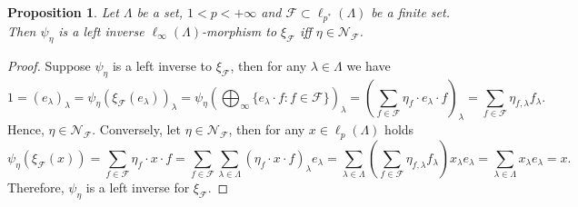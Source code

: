 \documentclass[12pt]{article}
\newtheorem{proposition}[theorem]{Proposition}
\begin{document}
\begin{proposition}\label{StdEmbdLeftInvCharac}
    Let $\Lambda$ be a set, $1<p<+\infty$ 
    and $\mathcal{F}\subset\ell_{p^*}(\Lambda)$ be a finite set. 
    Then $\psi_\eta$ is a left inverse $\ell_\infty(\Lambda)$-morphism 
    to $\xi_{\mathcal{F}}$ iff $\eta\in\mathcal{N}_{\mathcal{F}}$.
\end{proposition}
\begin{proof} 
    Suppose $\psi_{\eta}$ is a left inverse to $\xi_{\mathcal{F}}$, then
    for any $\lambda\in\Lambda$ we have
    \[
        1=(e_\lambda)_\lambda
        =\psi_{\eta}(\xi_{\mathcal{F}}(e_\lambda))_\lambda
        =\psi_{\eta}\left(\bigoplus_\infty\{
            e_\lambda\cdot f: f\in\mathcal{F}
        \}\right)_\lambda
        =\left(
            \sum_{f\in\mathcal{F}} \eta_f\cdot e_\lambda\cdot f
        \right)_\lambda
        =\sum_{f\in\mathcal{F}} \eta_{f,\lambda}f_\lambda.
    \]
    Hence, $\eta\in\mathcal{N}_{\mathcal{F}}$.
    Conversely, let $\eta\in\mathcal{N}_{\mathcal{F}}$, then for 
    any $x\in\ell_p(\Lambda)$ holds
    \[
        \psi_\eta(\xi_{\mathcal{F}}(x))
        =\sum_{f\in\mathcal{F}}\eta_f\cdot x\cdot f 
        =\sum_{f\in\mathcal{F}}\sum_{\lambda\in\Lambda} 
            (\eta_f\cdot x\cdot f)_\lambda e_\lambda 
        =\sum_{\lambda\in\Lambda} 
            \left(\sum_{f\in\mathcal{F}}\eta_{f,\lambda}f_\lambda\right) 
            x_\lambda e_\lambda 
        =\sum_{\lambda\in\Lambda} x_\lambda e_\lambda 
        =x. 
    \]
    Therefore, $\psi_\eta$ is a left inverse for $\xi_{\mathcal{F}}$.
\end{proof}
\end{document}
